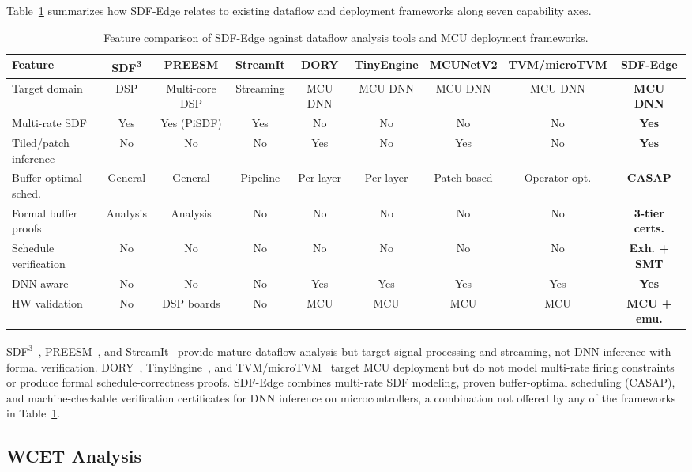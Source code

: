 \documentclass[journal]{IEEEtran}
\begin{document}
Table~\ref{tab:comparison} summarizes how SDF-Edge relates to existing dataflow and deployment frameworks along seven capability axes.

\begin{table}[htbp]
\centering
\caption{Feature comparison of SDF-Edge against dataflow analysis tools and MCU deployment frameworks.}
\label{tab:comparison}
\begin{tabular}{@{}lcccccccc@{}}
\toprule
Feature & SDF\textsuperscript{3} & PREESM & StreamIt & DORY & TinyEngine & MCUNetV2 & TVM/\mbox{microTVM} & \textbf{SDF-Edge} \\
\midrule
Target domain & DSP & Multi-core DSP & Streaming & MCU DNN & MCU DNN & MCU DNN & MCU DNN & \textbf{MCU DNN} \\
Multi-rate SDF & Yes & Yes (PiSDF) & Yes & No & No & No & No & \textbf{Yes} \\
Tiled/patch inference & No & No & No & Yes & No & Yes & No & \textbf{Yes} \\
Buffer-optimal sched. & General & General & Pipeline & Per-layer & Per-layer & Patch-based & Operator opt. & \textbf{CASAP} \\
Formal buffer proofs & Analysis & Analysis & No & No & No & No & No & \textbf{3-tier certs.} \\
Schedule verification & No & No & No & No & No & No & No & \textbf{Exh. + SMT} \\
DNN-aware & No & No & No & Yes & Yes & Yes & Yes & \textbf{Yes} \\
HW validation & No & DSP boards & No & MCU & MCU & MCU & MCU & \textbf{MCU + emu.} \\
\bottomrule
\end{tabular}
\end{table}

SDF\textsuperscript{3}~\cite{stuijk2006sdf3}, PREESM~\cite{pelcat2014preesm}, and StreamIt~\cite{thies2002streamit} provide mature dataflow analysis but target signal processing and streaming, not DNN inference with formal verification.
DORY~\cite{burrello2021dory}, TinyEngine~\cite{lin2020mcunet}, and TVM/microTVM~\cite{chen2018tvm} target MCU deployment but do not model multi-rate firing constraints or produce formal schedule-correctness proofs.
SDF-Edge combines multi-rate SDF modeling, proven buffer-optimal scheduling (CASAP), and machine-checkable verification certificates for DNN inference on microcontrollers, a combination not offered by any of the frameworks in Table~\ref{tab:comparison}.

\subsection{WCET Analysis}
\end{document}
